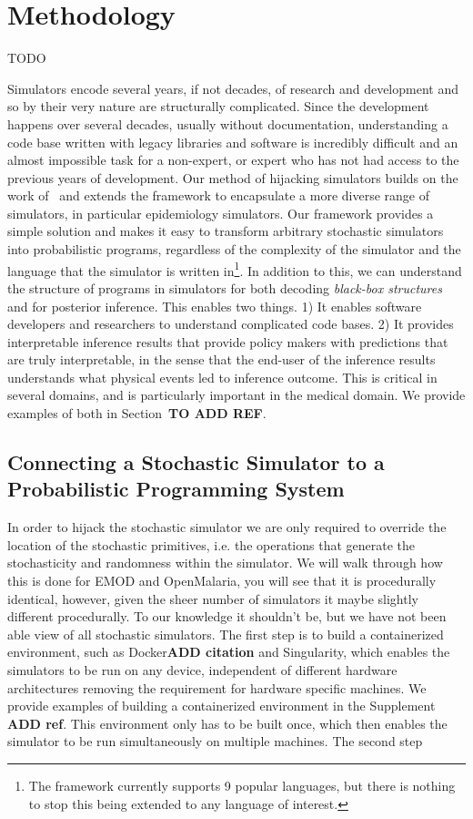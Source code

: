 \documentclass{article}
\begin{document}
\section{Methodology}
 TODO



Simulators encode several years, if not decades, of research and development and so by their very nature are structurally complicated. Since the development happens over several decades, usually without documentation, understanding a code base written with legacy libraries and software is incredibly difficult and an almost impossible task for a non-expert, or expert who has not had access to the previous years of development. Our method of hijacking simulators builds on the work of~\cite{baydin2018efficient} and extends the framework to encapsulate a more diverse range of simulators, in particular epidemiology simulators. Our framework provides a simple solution and makes it easy to transform arbitrary stochastic simulators into probabilistic programs, regardless of the complexity of the simulator and the language that the simulator is written in\footnote{The framework currently supports 9 popular languages, but there is nothing to stop this being extended to any language of interest.}. In addition to this, we can understand the structure of programs in simulators for both decoding \emph{black-box structures} and for posterior inference. This enables two things. 1) It enables software developers and researchers to understand complicated code bases. 2) It provides interpretable inference results that provide policy makers with predictions that are truly interpretable, in the sense that the end-user of the inference results understands what physical events led to inference outcome. This is critical in several domains, and is particularly important in the medical domain. We provide examples of both in Section~\textbf{TO ADD REF}.

\subsection{Connecting a Stochastic Simulator to a Probabilistic Programming System}

In order to hijack the stochastic simulator we are only required to override the location of the stochastic primitives, i.e. the operations that generate the stochasticity and randomness within the simulator. We will walk through how this is done for EMOD and OpenMalaria,  you will see that it is procedurally identical, however, given the sheer number of simulators it maybe slightly different procedurally. To our knowledge it shouldn't be, but we have not been able view of all stochastic simulators. 
The first step is to build a containerized environment, such as Docker\textbf{ADD citation} and Singularity, which enables the simulators to be
run on any device, independent of different hardware architectures removing the requirement for hardware specific machines. We provide examples of building a containerized environment in the Supplement \textbf{ADD ref}. This environment only has to be built once, which then enables the simulator to be run simultaneously on multiple machines. 
The second step 
\end{document}
